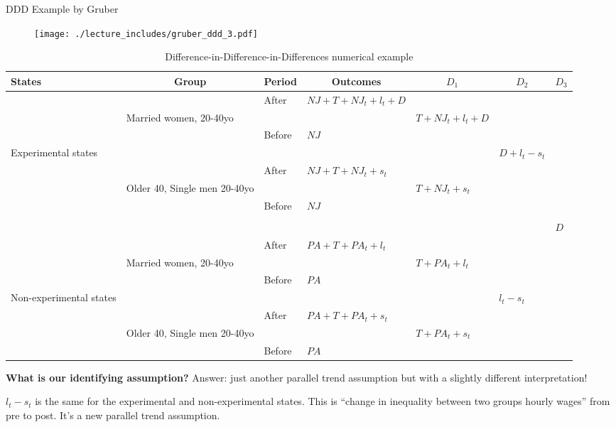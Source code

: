 \documentclass{beamer}
\begin{document}
\begin{frame}{DDD Example by Gruber}
	
	\begin{figure}
	\texttt{[image: ./lecture\_includes/gruber\_ddd\_3.pdf]}
	\end{figure}
	
\end{frame}



\begin{frame}[shrink=20]

\begin{table}\centering
		\caption{Difference-in-Difference-in-Differences numerical example}
		\tiny
		\begin{center}
		\begin{tabular}{lll|l|lll}
		\hline \hline
		\multicolumn{1}{l}{\textbf{States}}&
		\multicolumn{1}{c}{\textbf{Group}}&
		\multicolumn{1}{c}{\textbf{Period}}&
		\multicolumn{1}{c}{\textbf{Outcomes}}&
		\multicolumn{1}{c}{$D_1$}&
		\multicolumn{1}{c}{$D_2$}&
		\multicolumn{1}{c}{$D_3$}\\
		\hline
		&&After	&$NJ+T+NJ_t+l_t+D$					\\
	&Married women, 20-40yo			&&&$T+NJ_t+l_t+D$			\\
		&&Before	&$NJ$					\\
Experimental states					&&&&&$D+l_t-s_t$			\\
		&&After	&$NJ+T+NJ_t+s_t$					\\
	&Older 40, Single men 20-40yo		&&	&$T+NJ_t+s_t$				\\
		&&Before	&$NJ$					\\
								\\
&&&&&&$D$
\\
		&&After	&$PA+T+PA_t+l_t$				\\
	&Married women, 20-40yo			&&&$T+PA_t+l_t$ \\				
		&&Before	&$PA$					\\
Non-experimental states					&&&&&$l_t-s_t$		\\
		&&After	&$PA+T+PA_t+s_t$					\\
	&Older 40, Single men 20-40yo		&&&	$T+PA_t+s_t$				\\
		&&Before	&$PA$					\\
		\hline \hline
		\end{tabular}
		\end{center}
	\end{table}
	
\textbf{What is our identifying assumption?} Answer: just another parallel trend assumption but with a slightly different interpretation!

\bigskip

$l_t-s_t$ is the same for the experimental and non-experimental states. This is ``change in inequality between two groups hourly wages'' from pre to post.  It's a new parallel trend assumption.



\end{frame}
\end{document}
